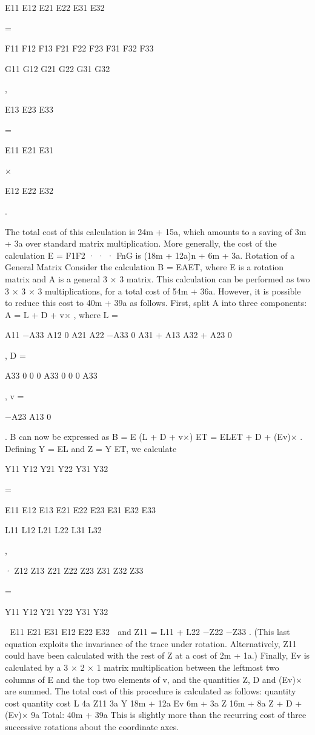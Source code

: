 E11 E12 E21 E22 E31 E32

=

F11 F12 F13 F21 F22 F23 F31 F32 F33

G11 G12 G21 G22 G31 G32

,

E13 E23 E33

=

E11 E21 E31

×

E12 E22 E32

.

The total cost of this calculation is 24m + 15a, which amounts to a saving of 3m + 3a over standard matrix multiplication. More generally, the cost of the calculation E = F1F2 · · · FnG is (18m + 12a)n + 6m + 3a. Rotation of a General Matrix Consider the calculation B = EAET, where E is a rotation matrix and A is a general 3 × 3 matrix. This calculation can be performed as two 3 × 3 × 3 multiplications, for a total cost of 54m + 36a. However, it is possible to reduce this cost to 40m + 39a as follows. First, split A into three components: A = L + D + v× , where L =

A11 −A33 A12 0 A21 A22 −A33 0 A31 + A13 A32 + A23 0

, D =

A33 0 0 0 A33 0 0 0 A33

, v =

−A23 A13 0

. B can now be expressed as B = E (L + D + v×) ET = ELET + D + (Ev)× . Defining Y = EL and Z = Y ET, we calculate

Y11 Y12 Y21 Y22 Y31 Y32

=

E11 E12 E13 E21 E22 E23 E31 E32 E33

L11 L12 L21 L22 L31 L32

,

· Z12 Z13 Z21 Z22 Z23 Z31 Z32 Z33

=

Y11 Y12 Y21 Y22 Y31 Y32

 E11 E21 E31 E12 E22 E32  and Z11 = L11 + L22 −Z22 −Z33 . (This last equation exploits the invariance of the trace under rotation. Alternatively, Z11 could have been calculated with the rest of Z at a cost of 2m + 1a.) Finally, Ev is calculated by a 3 × 2 × 1 matrix multiplication between the leftmost two columns of E and the top two elements of v, and the quantities Z, D and (Ev)× are summed. The total cost of this procedure is calculated as follows: quantity cost quantity cost L 4a Z11 3a Y 18m + 12a Ev 6m + 3a Z 16m + 8a Z + D + (Ev)× 9a Total: 40m + 39a This is slightly more than the recurring cost of three successive rotations about the coordinate axes.

